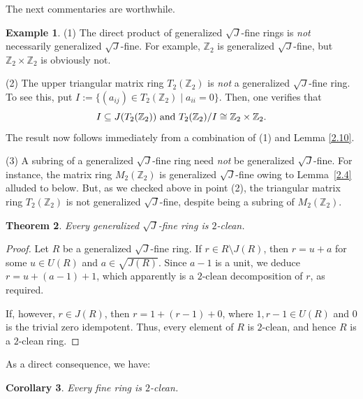 \documentclass[12pt]{amsart}
\newtheorem{theorem}{Theorem}[section]
\newtheorem{corollary}[theorem]{Corollary}
\theoremstyle{definition}
\newtheorem{example}[theorem]{Example}
\begin{document}
The next commentaries are worthwhile.

\begin{example}\label{direct}
(1) The direct product of generalized \( \sqrt{J} \)-fine rings is \textit{not} necessarily generalized \( \sqrt{J} \)-fine. For example, \( \mathbb{Z}_2 \) is generalized \( \sqrt{J} \)-fine, but \( \mathbb{Z}_2 \times \mathbb{Z}_2 \) is obviously not.

(2) The upper triangular matrix ring \( T_2(\mathbb{Z}_2) \) is \textit{not} a generalized \(\sqrt{J}\)-fine ring. To see this, put
$
I := \{(a_{ij}) \in T_2(\mathbb{Z}_2) \mid a_{ii} = 0\}.
$
Then, one verifies that \[ I \subseteq J(T_2(\mathbb{Z}_2)) ~ {\rm and} ~  T_2(\mathbb{Z}_2)/I \cong \mathbb{Z}_2 \times \mathbb{Z}_2 .\] The result now follows immediately from a combination of (1) and Lemma \ref{2.10}.

(3) A subring of a generalized \(\sqrt{J}\)-fine ring need \textit{not} be generalized \(\sqrt{J}\)-fine. For instance, the matrix ring \(M_2(\mathbb{Z}_2)\) is generalized $\sqrt{J}$-fine owing to Lemma~\ref{2.4} alluded to below. But, as we checked above in point (2), the triangular matrix ring \(T_2(\mathbb{Z}_2)\) is not generalized $\sqrt{J}$-fine, despite being a subring of \(M_2(\mathbb{Z}_2)\).
\end{example}

\begin{theorem}\label{2.14}
Every generalized \(\sqrt{J}\)-fine ring is \(2\)-clean.
\end{theorem}

\begin{proof}
Let \( R \) be a generalized \(\sqrt{J}\)-fine ring. If \( r \in R \setminus J(R) \), then \( r = u + a \) for some \( u \in U(R) \) and \( a \in \sqrt{J(R)} \). Since \( a - 1 \) is a unit, we deduce \( r = u + (a - 1) + 1 \), which apparently is a \( 2 \)-clean decomposition of \( r \), as required. 

If, however, \( r \in J(R) \), then \( r = 1 + (r - 1) + 0 \), where \( 1, r - 1 \in U(R) \) and \( 0 \) is the trivial zero idempotent. Thus, every element of \( R \) is \( 2 \)-clean, and hence \( R \) is a \( 2 \)-clean ring.
\end{proof}

As a direct consequence, we have:

\begin{corollary}
Every fine ring is \(2\)-clean.
\end{corollary}
\end{document}
